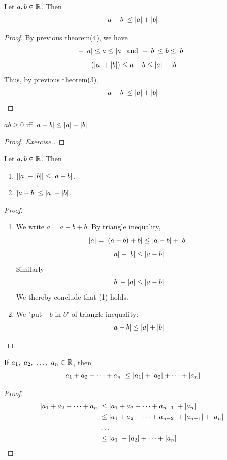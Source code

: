 \documentclass[a4paper,12pt]{article}
\begin{document}
\begin{theorem}
    Let \(a,b\in\R\). Then 
    \[\abs{a+b}\le \abs{a}+\abs{b}\]
    \begin{proof}
        By previous theorem(4), we have 
        \[-\abs{a}\le a\le \abs{a}\text{ and } -\abs{b}\le b\le \abs{b}\]
        \[-(\abs{a}+\abs{b})\le a+b\le \abs{a}+\abs{b}\]
        Thus, by previous theorem(3),
        \[\abs{a+b}\le\abs{a}+\abs{b}\]
    \end{proof}
\end{theorem}

\begin{remark}
    \(ab\ge 0\) iff \(\abs{a+b}\le\abs{a}+\abs{b}\)
    \begin{proof}[Proof. Exercise.]
        
    \end{proof}
\end{remark}

\begin{corollary}
    Let \(a,b\in\R\). Then 
    \begin{enumerate}
        \item \(\abs{\abs{a}-\abs{b}}\le\abs{a-b}\).
        \item \(\abs{a-b}\le\abs{a}+\abs{b}\).
    \end{enumerate}
    \begin{proof}\ 
        \begin{enumerate}
            \item We write \(a=a-b+b\). By triangle inequality, 
            \[\abs{a}=\abs{(a-b)+b}\le\abs{a-b}+\abs{b}\]
            \[\abs{a}-\abs{b}\le\abs{a-b}\]
            Similarly \[\abs{b}-\abs{a}\le\abs{a-b}\]
            We thereby conclude that (1) holds.
            \item We "put \(-b\) in \(b\)" of triangle inequality:
            \[\abs{a-b}\le\abs{a}+\abs{b}\]
        \end{enumerate}
    \end{proof}
\end{corollary}

\begin{corollary}
    If \(a_1,\ a_2,\ \dots,\ a_n\in\R\), then 
    \[\abs{a_1+a_2+\dots+a_n}\le\abs{a_1}+\abs{a_2}+\dots+\abs{a_n}\]
    \begin{proof}
        \begin{align*}
            \abs{a_1+a_2+\dots+a_n}&\le\abs{a_1+a_2+\dots+a_{n-1}}+\abs{a_n}\\
            &\le \abs{a_1+a_2+\dots+a_{n-2}}+\abs{a_{n-1}}+\abs{a_n}\\
            & \dots\\
            &\le \abs{a_1}+\abs{a_2}+\dots+\abs{a_n}
        \end{align*}
    \end{proof}
\end{corollary}
\end{document}
